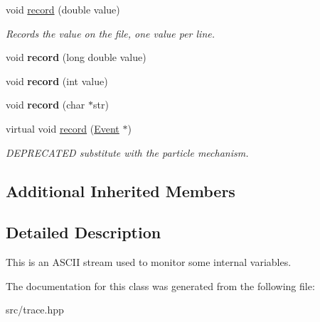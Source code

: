 \begin{DoxyCompactItemize}
\item 
void \hyperlink{classMetaSim_1_1TraceAscii_a8bbb540a851d97e6ae98cb7f21706604}{record} (double value)\hypertarget{classMetaSim_1_1TraceAscii_a8bbb540a851d97e6ae98cb7f21706604}{}\label{classMetaSim_1_1TraceAscii_a8bbb540a851d97e6ae98cb7f21706604}

\begin{DoxyCompactList}\small\item\em Records the value on the file, one value per line. \end{DoxyCompactList}\item 
void {\bfseries record} (long double value)\hypertarget{classMetaSim_1_1TraceAscii_ae7d3bcf4bd60800208847e3fcaddbc25}{}\label{classMetaSim_1_1TraceAscii_ae7d3bcf4bd60800208847e3fcaddbc25}

\item 
void {\bfseries record} (int value)\hypertarget{classMetaSim_1_1TraceAscii_a38e5886740f0d043bda62846641a2e9c}{}\label{classMetaSim_1_1TraceAscii_a38e5886740f0d043bda62846641a2e9c}

\item 
void {\bfseries record} (char $\ast$str)\hypertarget{classMetaSim_1_1TraceAscii_a8595d3c4b53ce20fe84c26b9332282b8}{}\label{classMetaSim_1_1TraceAscii_a8595d3c4b53ce20fe84c26b9332282b8}

\item 
virtual void \hyperlink{classMetaSim_1_1TraceAscii_a834f6555418ee5ad9cecf5f896aafb0b}{record} (\hyperlink{classMetaSim_1_1Event}{Event} $\ast$)\hypertarget{classMetaSim_1_1TraceAscii_a834f6555418ee5ad9cecf5f896aafb0b}{}\label{classMetaSim_1_1TraceAscii_a834f6555418ee5ad9cecf5f896aafb0b}

\begin{DoxyCompactList}\small\item\em D\+E\+P\+R\+E\+C\+A\+T\+ED substitute with the particle mechanism. \end{DoxyCompactList}\end{DoxyCompactItemize}

\subsection*{Additional Inherited Members}


\subsection{Detailed Description}
This is an A\+S\+C\+II stream used to monitor some internal variables. 

The documentation for this class was generated from the following file\+:\begin{DoxyCompactItemize}
\item 
src/trace.\+hpp\end{DoxyCompactItemize}
